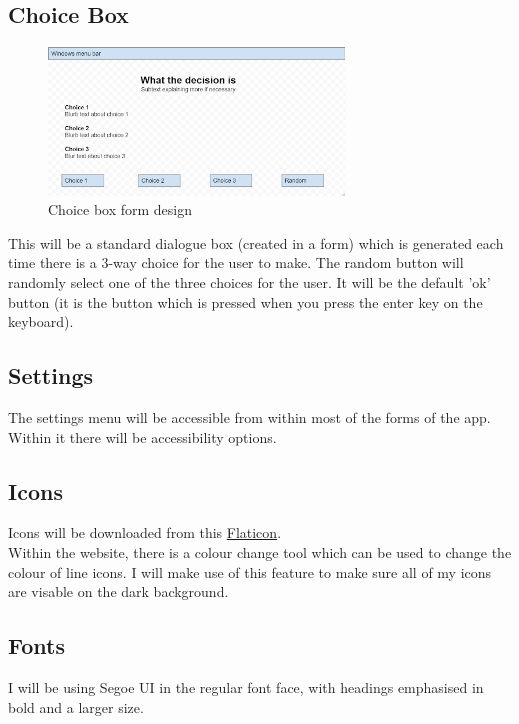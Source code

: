 \subsection{Choice Box}
\begin{figure}[H]
    \centering
    \includegraphics[width=0.7\textwidth]{images/design/choiceBox.png}
    \caption{Choice box form design}
    \label{fig:design-choiceBox}
\end{figure}
This will be a standard dialogue box (created in a form) which is generated each time there is a 3-way choice for the user to make. The random button will randomly select one of the three choices for the user. It will be the default 'ok' button (it is the button which is pressed when you press the enter key on the keyboard).

\subsection{Settings}
The settings menu will be accessible from within most of the forms of the app. Within it there will be accessibility options.

\subsection{Icons}
Icons will be downloaded from this \href{https://www.flaticon.com/}{Flaticon}.\\
Within the website, there is a colour change tool which can be used to change the colour of line icons. I will make use of this feature to make sure all of my icons are visable on the dark background.

\subsection{Fonts}
I will be using Segoe UI in the regular font face, with headings emphasised in bold and a larger size.

